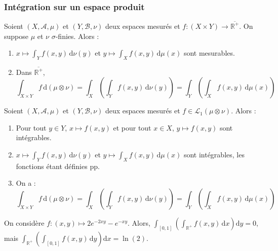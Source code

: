   \subsubsection{Intégration sur un espace produit}


  \begin{theorem}
    Soient $(X, \mathcal{A}, \mu)$ et $(Y, \mathcal{B}, \nu)$ deux espaces mesurés et $f : (X \times Y) \rightarrow \overline{\mathbb{R}^+}$. On suppose $\mu$ et $\nu$ $\sigma$-finies. Alors :
    \begin{enumerate}[label={\bfseries(\roman*)}]
      \item $x \mapsto \int_Y f(x,y) \, \mathrm{d}\nu(y)$ et $y \mapsto \int_X f(x,y) \, \mathrm{d}\mu(x)$ sont mesurables.
      \item Dans $\overline{\mathbb{R}^+}$,
      \[ \int_{X \times Y} f \, \mathrm{d}(\mu \otimes \nu) = \int_X \left( \int_Y f(x,y) \, \mathrm{d}\nu(y) \right) = \int_Y \left( \int_X f(x,y) \, \mathrm{d}\mu(x) \right) \]
    \end{enumerate}
  \end{theorem}

  \begin{theorem}
    Soient $(X, \mathcal{A}, \mu)$ et $(Y, \mathcal{B}, \nu)$ deux espaces mesurés et $f \in \mathcal{L}_1 (\mu \otimes \nu)$. Alors :
    \begin{enumerate}[label={\bfseries(\roman*)}]
      \item Pour tout $y \in Y$, $x \mapsto f(x,y)$ et pour tout $x \in X$, $y \mapsto f(x,y)$ sont intégrables.
      \item $x \mapsto \int_Y f(x,y) \, \mathrm{d}\nu(y)$ et $y \mapsto \int_X f(x,y) \, \mathrm{d}\mu(x)$ sont intégrables, les fonctions étant définies pp.
      \item On a :
      \[ \int_{X \times Y} f \, \mathrm{d}(\mu \otimes \nu) = \int_X \left( \int_Y f(x,y) \, \mathrm{d}\nu(y) \right) = \int_Y \left( \int_X f(x,y) \, \mathrm{d}\mu(x) \right) \]
    \end{enumerate}
  \end{theorem}

  \begin{cexample}
    On considère $f : (x,y) \mapsto 2e^{-2xy} - e^{-xy}$. Alors, $\int_{[0,1]} \left( \int_{\mathbb{R}^+} f(x,y) \, \mathrm{d}x \right) \mathrm{d}y = 0$, mais $\int_{\mathbb{R}^+} \left( \int_{[0,1]} f(x,y) \, \mathrm{d}y \right) \mathrm{d}x = \ln(2)$.
  \end{cexample}


